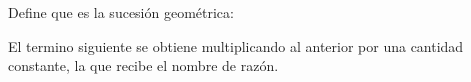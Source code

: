 
\question Define que es la sucesión geométrica:
  \begin{solution}[2cm]
    El termino siguiente se obtiene multiplicando al anterior por una
    cantidad constante, la que recibe el nombre de razón.
  \end{solution}
